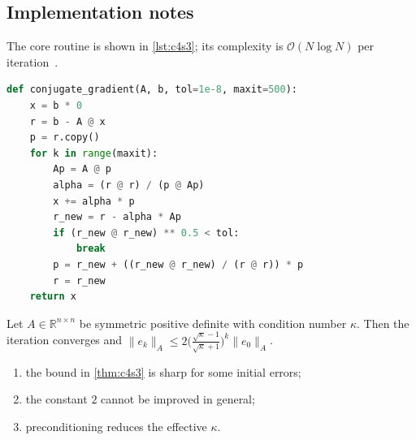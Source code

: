 \lipsum[121-122]

\subsection{Implementation notes}\label{sec:c4s3-i}
The core routine is shown in \cref{lst:c4s3}; its complexity is $\mathcal{O}(N\log N)$ per iteration~\cite{ch4-14}.

\begin{lstlisting}[language=python,caption={Reference implementation for c4s3.},label={lst:c4s3}]
def conjugate_gradient(A, b, tol=1e-8, maxit=500):
    x = b * 0
    r = b - A @ x
    p = r.copy()
    for k in range(maxit):
        Ap = A @ p
        alpha = (r @ r) / (p @ Ap)
        x += alpha * p
        r_new = r - alpha * Ap
        if (r_new @ r_new) ** 0.5 < tol:
            break
        p = r_new + ((r_new @ r_new) / (r @ r)) * p
        r = r_new
    return x
\end{lstlisting}

\lipsum[64-64]
\begin{theorem}\label{thm:c4s3}
Let $A\in\mathbb{R}^{n\times n}$ be symmetric positive definite with condition number $\kappa$. Then the iteration converges and
$\lVert e_k\rVert_A \le 2\bigl(\tfrac{\sqrt\kappa-1}{\sqrt\kappa+1}\bigr)^k\lVert e_0\rVert_A$.
\end{theorem}
\begin{enumerate}[label=(\roman*)]
\item the bound in \cref{thm:c4s3} is sharp for some initial errors;
\item the constant $2$ cannot be improved in general;
\item preconditioning reduces the effective $\kappa$.
\end{enumerate}

\lipsum[86-86]
